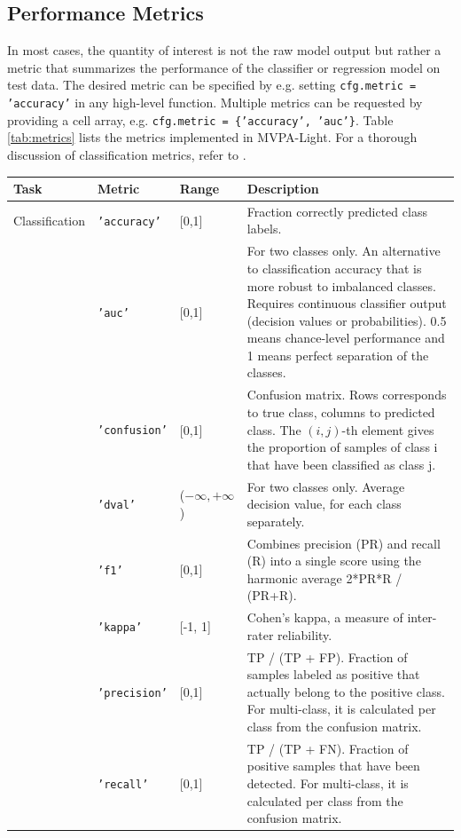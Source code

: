 \documentclass[utf8]{frontiersSCNS} %
\newcommand{\ttt}[1]{\texttt{#1}}
\begin{document}
\subsection{Performance Metrics}\label{sec:metrics}

In most cases, the quantity of interest is not the raw model output but rather a metric that summarizes the performance of the classifier or regression model on test data. The desired metric can be specified by e.g. setting \ttt{cfg.metric = 'accuracy'} in any high-level function. Multiple metrics can be requested by providing a cell array, e.g. \ttt{cfg.metric = \{'accuracy', 'auc'\}}. Table \ref{tab:metrics} lists the metrics implemented in MVPA-Light. For a thorough discussion of classification metrics, refer to  \cite{Sokolova2009ATasks}.

\begin{table}[]
\begin{tabularx}{\textwidth}{lllX}
Task & Metric &  Range & Description   \\\hline
Classification & \ttt{'accuracy'}  &  [0,1] &  Fraction correctly predicted class labels.\\
 & \ttt{'auc'} & [0,1] & For two classes only. An alternative to classification accuracy that is more robust to imbalanced classes. Requires continuous classifier output (decision values or probabilities). 0.5 means chance-level performance and 1 means perfect separation of the classes.\\
 & \ttt{'confusion'} & [0,1] &  Confusion matrix. Rows corresponds to true class, columns  to predicted class. The $(i,j)$-th element gives the proportion of samples of class i that have been classified as class j.\\
 & \ttt{'dval'} & ($-\infty,+\infty$) & For two classes only. Average decision value, for each class separately.\\
 &\ttt{'f1'} & [0,1] & Combines precision (PR) and recall (R) into a single score using the harmonic average 2*PR*R / (PR+R).\\
&\ttt{'kappa'} & [-1, 1] & Cohen's kappa, a measure of inter-rater reliability.\\
& \ttt{'precision'} & [0,1] & TP / (TP + FP). Fraction of samples labeled as positive that actually belong to the positive class. For multi-class, it is calculated per class from the confusion matrix.\\
& \ttt{'recall'} & [0,1] & TP / (TP + FN). Fraction of positive samples that have been detected. For multi-class, it is calculated per class from the confusion matrix.\\

\end{tabularx}
\end{table}
\end{document}
